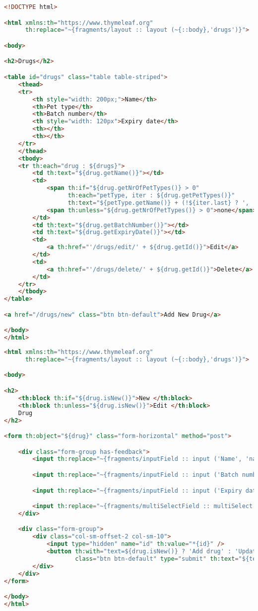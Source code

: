 \documentclass[12pt, a4paper]{article}
\begin{document}
\begin{lstlisting}[language=HTML, title='drugsList.html']
<!DOCTYPE html>

<html xmlns:th="https://www.thymeleaf.org"
      th:replace="~{fragments/layout :: layout (~{::body},'drugs')}">

<body>

<h2>Drugs</h2>

<table id="drugs" class="table table-striped">
    <thead>
    <tr>
        <th style="width: 200px;">Name</th>
        <th>Pet type</th>
        <th>Batch number</th>
        <th style="width: 120px">Expiry date</th>
        <th></th>
        <th></th>
    </tr>
    </thead>
    <tbody>
    <tr th:each="drug : ${drugs}">
        <td th:text="${drug.getName()}"></td>
        <td>
            <span th:if="${drug.getNrOfPetTypes()} > 0"
                  th:each="petType, iter : ${drug.getPetTypes()}"
                  th:text="${petType.getName()} + (!${iter.last} ? ', ' : '')"></span>
            <span th:unless="${drug.getNrOfPetTypes()} > 0">none</span>
        </td>
        <td th:text="${drug.getBatchNumber()}"></td>
        <td th:text="${drug.getExpiryDate()}"></td>
        <td>
            <a th:href="'/drugs/edit/' + ${drug.getId()}">Edit</a>
        </td>
        <td>
            <a th:href="'/drugs/delete/' + ${drug.getId()}">Delete</a>
        </td>
    </tr>
    </tbody>
</table>

<a href="/drugs/new" class="btn btn-default">Add New Drug</a>

</body>
</html>
\end{lstlisting}

\begin{lstlisting}[language=HTML, title='addOrUpdateDrug.html']
<html xmlns:th="https://www.thymeleaf.org"
      th:replace="~{fragments/layout :: layout (~{::body},'drugs')}">

<body>

<h2>
    <th:block th:if="${drug.isNew()}">New </th:block>
    <th:block th:unless="${drug.isNew()}">Edit </th:block>
    Drug
</h2>

<form th:object="${drug}" class="form-horizontal" method="post">

    <div class="form-group has-feedback">
        <input th:replace="~{fragments/inputField :: input ('Name', 'name', 'text')}" />

        <input th:replace="~{fragments/inputField :: input ('Batch number', 'batchNumber', 'text')}" />

        <input th:replace="~{fragments/inputField :: input ('Expiry date', 'expiryDate', 'date')}" />

        <input th:replace="~{fragments/multiSelectField :: multiSelect ('Pet types', 'petTypes', ${allPetTypes})}" />
    </div>

    <div class="form-group">
        <div class="col-sm-offset-2 col-sm-10">
            <input type="hidden" name="id" th:value="*{id}" />
            <button th:with="text=${drug.isNew()} ? 'Add drug' : 'Update drug'"
                    class="btn btn-default" type="submit" th:text="${text}"></button>
        </div>
    </div>
</form>

</body>
</html>
\end{lstlisting}
\end{document}
